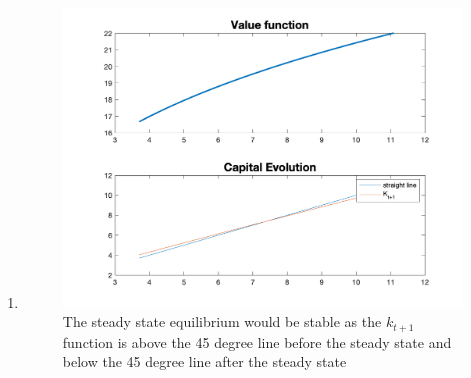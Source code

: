 \begin{enumerate}
    \item  \begin{figure}[h]
       \centering
       \includegraphics[width = .7\linewidth]{HW3/pics/HW3_Q1_figure.png}
       \caption{The steady state equilibrium would be stable as the $k_{t+1}$ function is above the 45 degree line before the steady state and below the 45 degree line after the steady state}
       \label{fig:HW3_2c}
   \end{figure}
\end{enumerate}